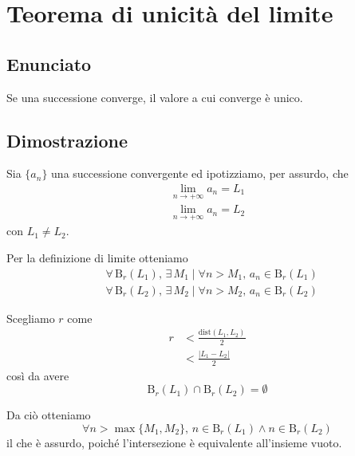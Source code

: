 \documentclass[../../analisi1]{subfiles}
\begin{document}
    \chapter{Teorema di unicità del limite}

        \section*{Enunciato}

            Se una successione converge, il valore a cui converge è unico.

        \section*{Dimostrazione}

            Sia \(\{a_n\}\) una successione convergente ed ipotizziamo, per assurdo, che
            \begin{align*}
                \lim_{n \to +\infty} a_n = L_1\\
                \lim_{n \to +\infty} a_n = L_2
            \end{align*}
            con \(L_1 \neq L_2\).

            Per la definizione di limite otteniamo
            \begin{align*}
                &\forall \, \mathrm{B}_r (L_1), \, \exists \, M_1 \; | \; \forall n > M_1, \, a_n \in \mathrm{B}_r (L_1)\\
                &\forall \, \mathrm{B}_r (L_2), \, \exists \, M_2 \; | \; \forall n > M_2, \, a_n \in \mathrm{B}_r (L_2)
            \end{align*}

            Scegliamo \(r\) come
            \begin{align*}
                r &< \frac{\mathrm{dist} (L_1, L_2)}{2}\\
                &< \frac{|L_1 - L_2|}{2}
            \end{align*}
            così da avere
            \[
                \mathrm{B}_r (L_1) \cap \mathrm{B}_r (L_2) = \emptyset
            \]

            Da ciò otteniamo
            \[
                \forall n > \max\{M_1, M_2\}, \, n \in \mathrm{B}_r (L_1) \land n \in \mathrm{B}_r (L_2)
            \]
            il che è assurdo, poiché l'intersezione è equivalente all'insieme vuoto.
    
\end{document}
